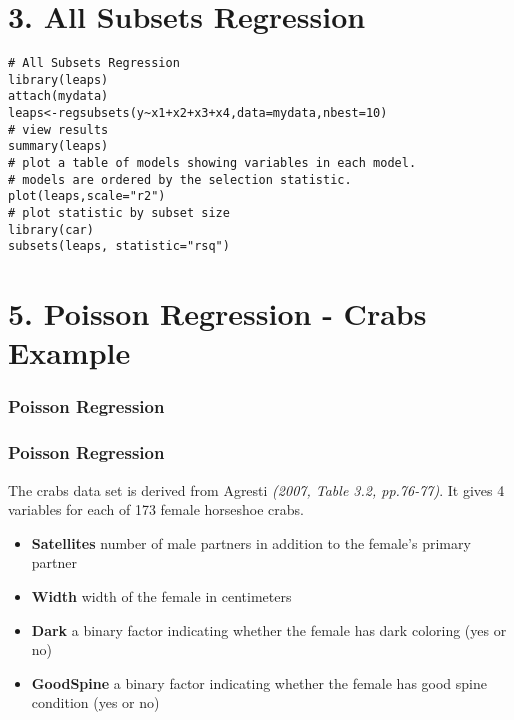 \documentclass{beamer}
\begin{document}
\section*{3. All Subsets Regression}
\begin{frame}[fragile]

\begin{verbatim}
# All Subsets Regression
library(leaps)
attach(mydata)
leaps<-regsubsets(y~x1+x2+x3+x4,data=mydata,nbest=10)
# view results 
summary(leaps)
# plot a table of models showing variables in each model.
# models are ordered by the selection statistic.
plot(leaps,scale="r2")
# plot statistic by subset size 
library(car)
subsets(leaps, statistic="rsq")
\end{verbatim}

\end{frame}
\section*{5. Poisson Regression - Crabs Example}
\begin{frame}[fragile]
\frametitle{Poisson Regression}
\Large



\end{frame}

\begin{frame}[fragile]
\frametitle{Poisson Regression}
\Large

The crabs data set is derived from Agresti \textit{(2007, Table 3.2, pp.76-77)}. It gives 4 variables for each of 173 female horseshoe crabs.
\begin{itemize}
\item \textbf{Satellites}
number of male partners in addition to the female's primary partner

\item \textbf{Width}
width of the female in centimeters

\item \textbf{Dark}
a binary factor indicating whether the female has dark coloring (yes or no)

\item \textbf{GoodSpine}
a binary factor indicating whether the female has good spine condition (yes or no)
\end{itemize}


\end{frame}
\end{document}
